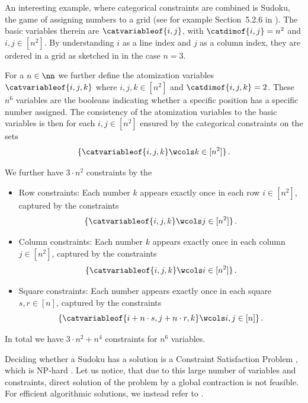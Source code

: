 \begin{example}[Sudoku]
    \label{exa:sudoku}
    An interesting example, where categorical constraints are combined is Sudoku, the game of assigning numbers to a grid (see for example Section~5.2.6 in \cite{russell_artificial_2021}).
    The basic variables therein are $\catvariableof{i,j}$, with $\catdimof{i,j}=n^2$ and $i,j\in[n^2]$.
    By understanding $i$ as a line index and $j$ as a column index, they are ordered in a grid as sketched in  in the case $n=3$.

    For a $n\in\nn$ we further define the atomization variables $\catvariableof{i,j,k}$ where $i,j,k\in[n^2]$ and $\catdimof{i,j,k}=2$.
    These $n^6$ variables are the booleans indicating whether a specific position has a specific number assigned.
    The consistency of the atomization variables to the basic variables is then for each $i,j\in[n^2]$ ensured by the categorical constraints on the sets
    \[ \{\catvariableof{i,j,k} \wcols k\in [n^2] \} \, . \]

    We further have $3\cdot n^2$ constraints by the
    \begin{itemize}
        \item Row constraints: Each number $k$ appears exactly once in each row $i\in[n^2]$, captured by the constraints
        \[ \{\catvariableof{i,j,k}  \wcols j \in [n^2] \} \, . \]
        \item Column constraints: Each number $k$ appears exactly once in each column $j\in[n^2]$, captured by the constraints
        \[ \{\catvariableof{i,j,k}  \wcols i \in [n^2] \} \, . \]
        \item Square constraints: Each number appears exactly once in each square $s,r\in[n]$, captured by the constraints
        \[ \{\catvariableof{i+n\cdot s,j+n\cdot r,k}  \wcols i,j \in [n] \} \, . \]
    \end{itemize}

    In total we have $3\cdot n^2 + n^4$ constraints for $n^6$ variables.

    Deciding whether a Sudoku has a solution is a Constraint Satisfaction Problem \cite{simonis_sudoku_2005}, which is NP-hard \cite{agerbeck_multi-agent_2008}.
    Let us notice, that due to this large number of variables and constraints, direct solution of the problem by a global contraction is not feasible.
    For efficient algorithmic solutions, we instead refer to .


\end{example}
